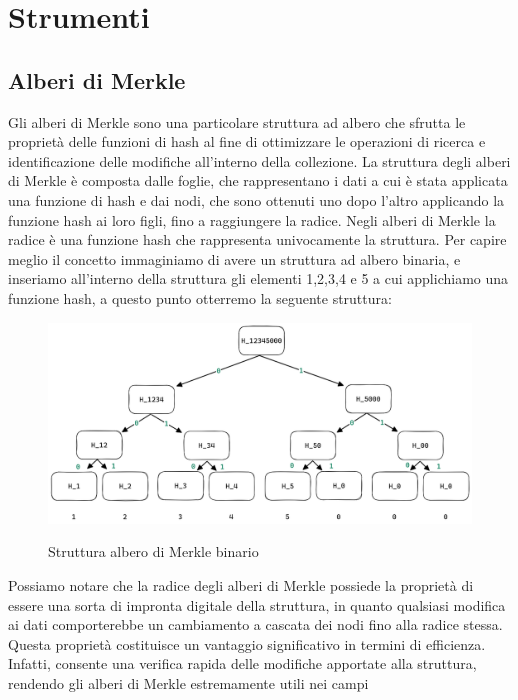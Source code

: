 \section{Strumenti}
\subsection{Alberi di Merkle}

Gli alberi di Merkle sono una particolare struttura ad albero che sfrutta le proprietà delle funzioni di hash al fine di
ottimizzare le operazioni di ricerca e identificazione delle modifiche all'interno della collezione. La struttura degli
alberi di Merkle è composta dalle foglie, che rappresentano i dati a cui è stata applicata una funzione di
hash e dai nodi, che sono ottenuti uno dopo l'altro applicando la funzione hash ai loro figli, fino a raggiungere
la radice. Negli alberi di Merkle la radice è una funzione hash che rappresenta univocamente la struttura. Per capire
meglio il concetto immaginiamo di avere un struttura ad albero binaria, e inseriamo all'interno della struttura gli
elementi 1,2,3,4 e 5 a cui applichiamo una funzione hash, a questo punto otterremo la seguente struttura:
\begin{figure}[H]
    \centering
    \includegraphics[width=13cm]{./chapters/2.rln-protocol/images/1.merkle_tree.png}
    \label{fig:merkle_tree}
    \captionsetup{justification=centering}
    \caption{Struttura albero di Merkle binario}
\end{figure}
Possiamo notare che la radice degli alberi di Merkle possiede la proprietà di essere una sorta di impronta digitale
della struttura, in quanto qualsiasi modifica ai dati comporterebbe un cambiamento a cascata dei nodi fino alla radice
stessa. Questa proprietà costituisce un vantaggio significativo in termini di efficienza. Infatti, consente una verifica
rapida delle modifiche apportate alla struttura, rendendo gli alberi di Merkle estremamente utili nei campi
